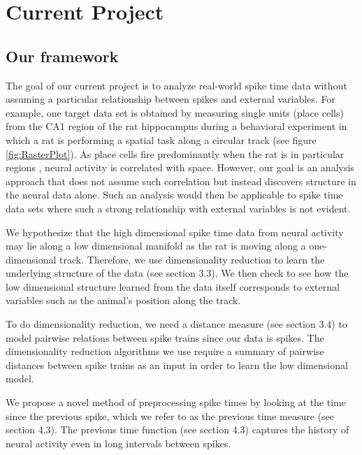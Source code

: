 
\section{Current Project}

\subsection{Our framework}
The goal of our current project  is to analyze real-world spike time data without assuming a particular relationship between spikes and external variables. For example, one target data set is  obtained by measuring single units (place cells)  from the CA1 region of the rat hippocampus during a behavioral experiment in which a rat is performing a spatial task along a circular track (see figure \ref{fig:RasterPlot}). As place cells fire predominantly when the rat is in  particular regions \cite{o1971hippocampus, Burgess1994}, neural activity is correlated with space. However, our goal is an analysis approach that does not assume such correlation but instead discovers structure in the neural data alone. Such an analysis would then be applicable to spike time data sets where such a strong relationship with external variables is not evident.


We hypothesize that the high dimensional spike time data from neural activity may lie along a low dimensional manifold 
as the rat is moving along a one-dimensional track.  Therefore, we use dimensionality  reduction to learn the underlying
structure of the data (see section 3.3). We then  check to see how the low dimensional structure learned from the 
data itself corresponds to external variables such as the animal's position along the track.


To do dimensionality reduction, we need a distance measure  (see  section 3.4) to model pairwise relations between spike trains since our data is spikes. The dimensionality reduction algorithms we use require a summary of pairwise distances between spike trains as an input in order to learn the low dimensional model.


We propose a novel method of preprocessing spike times by looking at the time since the previous spike, which we refer to
as the previous time measure (see section 4.3). The previous time function (see section 4.3) captures the history of neural activity even in long intervals between spikes.


